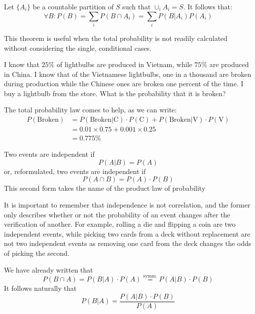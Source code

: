 \begin{theorem}
	Let $\{A_i\}$ be a countable partition of $S$ such that $\cup_i A_i = S$. It follows that:
	\[
	\forall B: P(B)=\sum_i P(B\cap A_i) = \sum_i P(B|A_i)P(A_i)
	\]
\label{th:total_prob_law}
\end{theorem}

This theorem is useful when the total probability is not readily calculated without considering the single, conditional cases.
\begin{example}
	I know that $25\%$ of lightbulbs are produced in Vietnam, while $75\%$ are produced in China. I know that of the Vietnamese lightbulbs, one in a thousand are broken during production while the Chinese ones are broken one percent of the time. I buy a lightbulb from the store. What is the probability that it is broken?
	
	The total probability law comes to help, as we can write:
	\begin{align*}
	P(\text{Broken}) &= P(\text{Broken}|\text{C})\cdot P(\text{C}) + P(\text{Broken}|\text{V})\cdot P(\text{V}) \\
	&= 0.01\times0.75 + 0.001\times0.25 \\
	&= 0.775\%
	\end{align*}
\end{example}

\begin{definition}
	Two events are independent if 
	\[
	P(A|B)=P(A)
	\]
	or, reformulated, two events are independent if
	\[
	P(A\cap B) = P(A)\cdot P(B)
	\]	
	This second form takes the name of the product law of probability
\end{definition}

It is important to remember that independence is not correlation, and the former only describes whether or not the probability of an event changes after the verification of another. For example, rolling a die and flipping a coin are two independent events, while picking two cards from a deck without replacement are not two independent events as removing one card from the deck changes the odds of picking the second. 

\begin{theorem}
	We have already written that 
	\[
	P(B\cap A) = P(B|A)\cdot P(A) \overset{\scriptscriptstyle \text{symm.}}{=} P(A|B)\cdot P(B)
	\]
	It follows naturally that
	\begin{equation}
		P(B|A) = \frac{P(A|B)\cdot P(B)}{P(A)}
	\tag{Bayes' Theorem}
	\end{equation}
\label{th:Bayes}
\end{theorem}	

